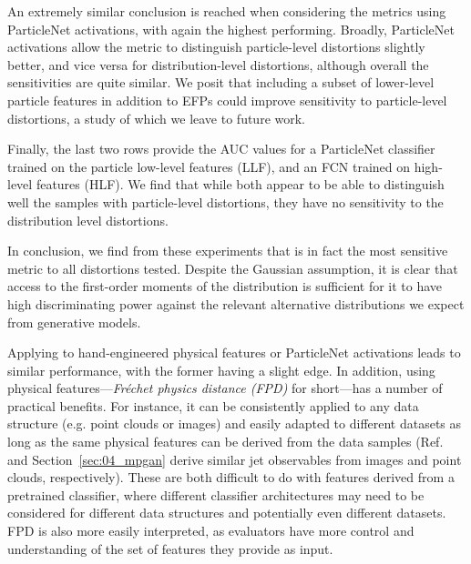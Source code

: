 An extremely similar conclusion is reached when considering the metrics using ParticleNet activations, with \fgdinf again the highest performing.
Broadly, ParticleNet activations allow the metric to distinguish particle-level distortions slightly better, and vice versa for distribution-level distortions, although overall the sensitivities are quite similar.
We posit that including a subset of lower-level particle features in addition to EFPs could improve sensitivity to particle-level distortions, a study of which we leave to future work.

Finally, the last two rows provide the AUC values for a ParticleNet classifier trained on the particle low-level features (LLF), and an FCN trained on high-level features (HLF).
We find that while both appear to be able to distinguish well the samples with particle-level distortions, they have no sensitivity to the distribution level distortions.

In conclusion, we find from these experiments that \fgdinf is in fact the most sensitive metric to all distortions tested.
Despite the Gaussian assumption, it is clear that access to the first-order moments of the distribution is sufficient for it to have high discriminating power against the relevant alternative distributions we expect from generative models.

Applying \fgdinf to hand-engineered physical features or ParticleNet activations leads to similar performance, with the former having a slight edge.
In addition, \fgdinf using physical features---\textit{Fr\'echet physics distance (FPD)} for short---has a number of practical benefits.
For instance, it can be consistently applied to any data structure (e.g. point clouds or images) and easily adapted to different datasets as long as the same physical features can be derived from the data samples (Ref.~\cite{deOliveira:2017pjk} and Section~\ref{sec:04_mpgan} derive similar jet observables from images and point clouds, respectively).
These are both difficult to do with features derived from a pretrained classifier, where different classifier architectures may need to be considered for different data structures and potentially even different datasets.
FPD is also more easily interpreted, as evaluators have more control and understanding of the set of features they provide as input.

